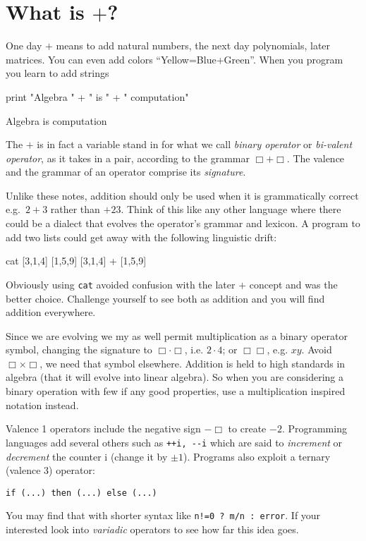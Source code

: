\chapter{What is $+$?}

One day  $+$ means to add natural numbers, the next day 
polynomials, later matrices.  
You can even add colors ``Yellow=Blue+Green''. When you program 
you learn to add strings
\begin{center}
\begin{notebookin}
print "Algebra " + " is " + " computation"
\end{notebookin}
\begin{notebookout}
Algebra is computation
\end{notebookout}
\end{center}
The $+$ is in fact a variable stand in for what we call \emph{binary operator}
or \emph{bi-valent operator}, as it takes in a pair, 
according to the grammar $\Box+\Box$.  The valence and the grammar 
of an operator comprise its  \emph{signature}.  

Unlike these notes, addition should only be used when it is grammatically 
correct e.g.\ $2+3$ rather than $+23$.  Think of this like any other language 
where there could be a dialect that evolves the operator's grammar and lexicon.  A program 
to add two lists could get away with the following linguistic drift:
\begin{center}
\begin{notebookin}
cat [3,1,4] [1,5,9]
[3,1,4] + [1,5,9]
\end{notebookin}
\begin{notebookout}[2]
[3,1,4,1,5,9]
[4,6,13]
\end{notebookout}
\end{center}
Obviously using \texttt{cat} avoided confusion with the later $+$ 
concept and was the better choice.
Challenge yourself to see both as addition and you will 
find addition everywhere. 

Since we are evolving we my as well permit multiplication as a binary operator 
symbol, changing the signature to $\Box \cdot \Box$, i.e. $2\cdot 4$; or
$\Box\Box$, e.g. $xy$.   Avoid $\Box\times \Box$,
we need that symbol elsewhere. Addition is held to high standards in algebra
(that it will evolve into linear algebra).  So when you are considering a
binary operation with few if any good properties, use a
multiplication inspired notation instead.   


Valence 1 operators include the negative sign $-\Box$ to create 
$-2$.  Programming languages add several others 
such as \lstinline{++i, --i} which are said to \emph{increment} 
or \emph{decrement} the counter i (change it by $\pm 1$).
Programs also exploit a ternary (valence 3) operator:
\begin{center}
    \lstinline[language=Sava]{if (...) then (...) else (...)}
\end{center}
You may find that with shorter syntax like 
\lstinline{n!=0 ? m/n : error}.
If your interested look into \emph{variadic} operators to see how 
far this idea goes.

